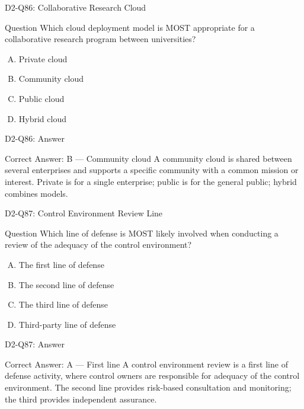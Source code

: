 \documentclass{beamer}
\begin{document}
	\begin{frame}{D2-Q86: Collaborative Research Cloud}
		\begin{block}{Question}
			Which cloud deployment model is MOST appropriate for a collaborative research program between universities?
		\end{block}
		\begin{enumerate}[(A)]
			\item Private cloud
			\item Community cloud
			\item Public cloud
			\item Hybrid cloud
		\end{enumerate}
	\end{frame}
	\begin{frame}{D2-Q86: Answer}
		\begin{block}{Correct Answer: B --- Community cloud}
			A community cloud is shared between several enterprises and supports a specific community with a common mission or interest. Private is for a single enterprise; public is for the general public; hybrid combines models.
		\end{block}
	\end{frame}
	
	\begin{frame}{D2-Q87: Control Environment Review Line}
		\begin{block}{Question}
			Which line of defense is MOST likely involved when conducting a review of the adequacy of the control environment?
		\end{block}
		\begin{enumerate}[(A)]
			\item The first line of defense
			\item The second line of defense
			\item The third line of defense
			\item Third-party line of defense
		\end{enumerate}
	\end{frame}
	\begin{frame}{D2-Q87: Answer}
		\begin{block}{Correct Answer: A --- First line}
			A control environment review is a first line of defense activity, where control owners are responsible for adequacy of the control environment. The second line provides risk-based consultation and monitoring; the third provides independent assurance.
		\end{block}
	\end{frame}
	
\end{document}
